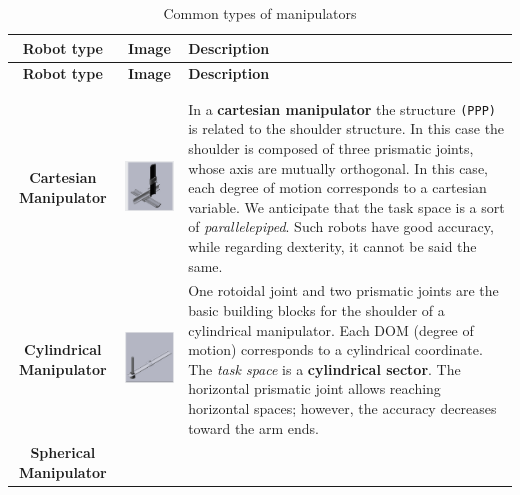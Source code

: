 \begin{longtable}{c c m{8cm}}
    \caption{Common types of manipulators}\\
    \hline
    \textbf{Robot type} & \textbf{Image} & \textbf{Description} \\
    \hline
    \endfirsthead

    \hline
    \textbf{Robot type} & \textbf{Image} & \textbf{Description} \\
    \hline
    \endhead

    \hline
    \endfoot

    \hline
    \endlastfoot\\
    \caption{Common types of manipulators}\label{tab:manip_types}\\

    \textbf{Cartesian Manipulator} & 
    \includegraphics[width=3cm]{img/man_cart.png} & 
    In a \textbf{cartesian manipulator} the structure \texttt{(PPP)} is related to the shoulder structure. In this case the shoulder is composed of three prismatic joints, whose axis are mutually orthogonal. In this case, each degree of motion corresponds to a cartesian variable. We anticipate that the task space is a sort of \textit{parallelepiped}. Such robots have good accuracy, while regarding dexterity, it cannot be said the same. \\
    \hline
    \textbf{Cylindrical Manipulator} & 
    \includegraphics[width=3cm]{img/cyl_man.png} & 
    One rotoidal joint and two prismatic joints are the basic building blocks for the shoulder of a cylindrical manipulator. Each DOM (degree of motion) corresponds to a cylindrical coordinate. The \textit{task space} is a \textbf{cylindrical sector}. The horizontal prismatic joint allows reaching horizontal spaces; however, the accuracy decreases toward the arm ends. \\
\hline
    \textbf{Spherical Manipulator} & 

\end{longtable}
